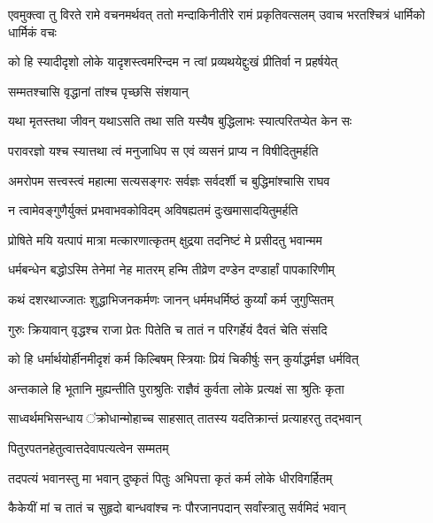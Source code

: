 
\threelineshloka
{एवमुक्त्वा तु विरते रामे वचनमर्थवत्}
{ततो मन्दाकिनीतीरे रामं प्रकृतिवत्सलम्}
{उवाच भरतश्चित्रं धार्मिको धार्मिकं वचः} %

\twolineshloka
{को हि स्यादीदृशो लोके यादृशस्त्वमरिन्दम}
{न त्वां प्रव्यथयेद्दुःखं प्रीतिर्वा न प्रहर्षयेत्} %

\onelineshloka
{सम्मतश्चासि वृद्धानां तांश्च पृच्छसि संशयान्} %

\twolineshloka
{यथा मृतस्तथा जीवन् यथाऽसति तथा सति}
{यस्यैष बुद्धिलाभः स्यात्परितप्येत केन सः} %

\twolineshloka
{परावरज्ञो यश्च स्यात्तथा त्वं मनुजाधिप}
{स एवं व्यसनं प्राप्य न विषीदितुमर्हति} %

\twolineshloka
{अमरोपम सत्त्वस्त्वं महात्मा सत्यसङ्गरः}
{सर्वज्ञः सर्वदर्शी च बुद्धिमांश्चासि राघव} %

\twolineshloka
{न त्वामेवङ्गुणैर्युक्तं प्रभवाभवकोविदम्}
{अविषह्यतमं दुःखमासादयितुमर्हति} %

\twolineshloka
{प्रोषिते मयि यत्पापं मात्रा मत्कारणात्कृतम्}
{क्षुद्रया तदनिष्टं मे प्रसीदतु भवान्मम} %

\twolineshloka
{धर्मबन्धेन बद्धोऽस्मि तेनेमां नेह मातरम्}
{हन्मि तीव्रेण दण्डेन दण्डार्हां पापकारिणीम्} %

\twolineshloka
{कथं दशरथाज्जातः शुद्धाभिजनकर्मणः}
{जानन् धर्ममधर्मिष्ठं कुर्य्यां कर्म जुगुप्सितम्} %

\twolineshloka
{गुरुः क्रियावान् वृद्धश्च राजा प्रेतः पितेति च}
{तातं न परिगर्हेयं दैवतं चेति संसदि} %

\twolineshloka
{को हि धर्मार्थयोर्हीनमीदृशं कर्म किल्बिषम्}
{स्त्रियाः प्रियं चिकीर्षुः सन् कुर्याद्धर्मज्ञ धर्मवित्} %

\twolineshloka
{अन्तकाले हि भूतानि मुह्यन्तीति पुराश्रुतिः}
{राज्ञैवं कुर्वता लोके प्रत्यक्षं सा श्रुतिः कृता} %

\twolineshloka
{साध्वर्थमभिसन्धाय ऺक्रोधान्मोहाच्च साहसात्}
{तातस्य यदतिक्रान्तं प्रत्याहरतु तद्भवान्} %

\onelineshloka
{पितुरपतनहेतुत्वात्तदेवापत्यत्वेन सम्मतम्} %

\twolineshloka
{तदपत्यं भवानस्तु मा भवान् दुष्कृतं पितुः}
{अभिपत्ता कृतं कर्म लोके धीरविगर्हितम्} %

\twolineshloka
{कैकेयीं मां च तातं च सुहृदो बान्धवांश्च नः}
{पौरजानपदान् सर्वांस्त्रातु सर्वमिदं भवान्} %

